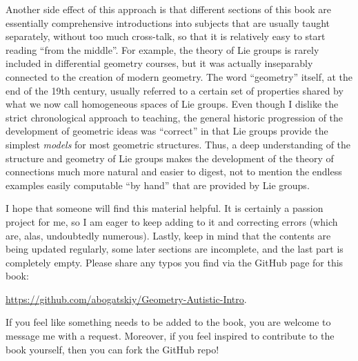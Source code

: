 Another side effect of this approach is that different sections of this book are essentially comprehensive introductions into subjects that are usually taught separately, without too much cross-talk, so that it is relatively easy to start reading ``from the middle''. For example, the theory of Lie groups is rarely included in differential geometry courses, but it was actually inseparably connected to the creation of modern geometry. The word ``geometry'' itself, at the end of the 19th century, usually referred to a certain set of properties shared by what we now call homogeneous spaces of Lie groups. Even though I dislike the strict chronological approach to teaching, the general historic progression of the development of geometric ideas was ``correct'' in that Lie groups provide the simplest \emph{models} for most  geometric structures. Thus, a deep understanding of the structure and geometry of Lie groups makes the development of the theory of connections much more natural and easier to digest, not to mention the endless examples easily computable ``by hand'' that are provided by Lie groups.

I hope that someone will find this material helpful. It is certainly a passion project for me, so I am eager to keep adding to it and correcting errors (which are, alas, undoubtedly numerous). Lastly, keep in mind that the contents are being updated regularly, some later sections are incomplete, and the last part is completely empty. Please share any typos you find via the GitHub page for this book:
\begin{center}
    \url{https://github.com/abogatskiy/Geometry-Autistic-Intro}.
\end{center}
If you feel like something needs to be added to the book, you are welcome to message me with a request. Moreover, if you feel inspired to contribute to the book yourself, then you can fork the GitHub repo!